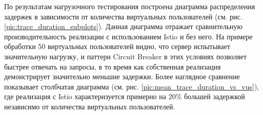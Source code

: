 \FloatBarrier 

По результатам нагрузочного тестирования построена диаграмма распределения задержек в зависимости от количества виртуальных пользователей (см. рис. \ref{pic:trace_duration_subplots}). Данная диаграмма отражает сравнительную производительность реализации с использованием Istio и без него. На примере обработки 50 виртуальных пользователей видно, что сервер испытывает значительную нагрузку, и паттерн Circuit Breaker в этих условиях позволяет быстрее отвечать на запросы, в то время как собственная реализация демонстрирует значительно меньшие задержки.
Более наглядное сравнение показывает столбчатая диаграмма (см. рис. \ref{pic:mean_trace_duration_vs_vus}), где реализация с Istio характеризуется примерно на 20\% большей задержкой независимо от количества виртуальных пользователей.




